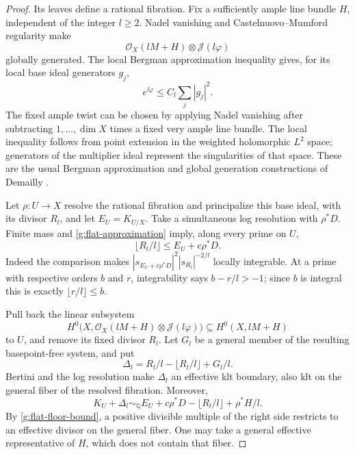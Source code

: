 \begin{proof}
Its leaves define a rational fibration.  Fix a sufficiently ample line
bundle \(H\), independent of the integer \(l\ge2\).  Nadel vanishing
and Castelnuovo--Mumford regularity make
\[
               \mathcal O_X(lM+H)\otimes\mathcal J(l\varphi)
\]
globally generated.  The local Bergman approximation inequality gives,
for its local base ideal generators \(g_j\),
\begin{equation}
                          e^{l\varphi}\le C_l\sum_j|g_j|^2.
 \label{g:flat-approximation}
\end{equation}
The fixed ample twist can be chosen by applying Nadel vanishing after
subtracting \(1,\ldots,\dim X\) times a fixed very ample line bundle.
The local inequality follows from point extension in the weighted
holomorphic \(L^2\) space; generators of the multiplier ideal represent
the singularities of that space.  These are the usual Bergman
approximation and global generation constructions of Demailly
\cite[Theorems~0.3 and 1.2]{Demailly2015}.

Let \(\rho:U\to X\) resolve the rational fibration and principalize this
base ideal, with its divisor \(R_l\), and let \(E_U=K_{U/X}\).  Take a
simultaneous log resolution with \(\rho^*D\).  Finite mass and
\eqref{g:flat-approximation} imply, along every prime on \(U\),
\begin{equation}
                         \lfloor R_l/l\rfloor
                                  \le E_U+c\rho^*D.
 \label{g:flat-floor-bound}
\end{equation}
Indeed the comparison makes
\(|s_{E_U+c\rho^*D}|^2|s_{R_l}|^{-2/l}\) locally integrable.
At a prime with respective orders \(b\) and \(r\), integrability says
\(b-r/l>-1\); since \(b\) is integral this is exactly
\(\lfloor r/l\rfloor\le b\).

Pull back the linear subsystem
\[
 H^0\bigl(X,\mathcal O_X(lM+H)\otimes\mathcal J(l\varphi)\bigr)
                  \subseteq H^0(X,lM+H)
\]
to \(U\), and remove its fixed divisor \(R_l\).  Let \(G_l\) be a
general member of the resulting basepoint-free system, and put
\[
           \Delta_l=R_l/l-\lfloor R_l/l\rfloor+G_l/l.
\]
Bertini and the log resolution make \(\Delta_l\) an effective klt
boundary, also klt on the general fiber of the resolved fibration.
Moreover,
\begin{equation}
 K_U+\Delta_l\sim_{\mathbb Q}
       E_U+c\rho^*D-\lfloor R_l/l\rfloor+\rho^*H/l.
 \label{g:flat-adjoint-approximation}
\end{equation}
By \eqref{g:flat-floor-bound}, a positive divisible multiple of the
right side restricts to an effective divisor on the general fiber.
One may take a general effective representative of \(H\), which does
not contain that fiber.


\end{proof}
